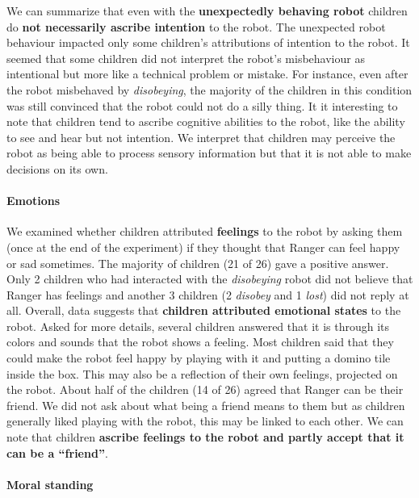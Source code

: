 \documentclass{sig-alternate}
\begin{document}
We can summarize that even with the \textbf{unexpectedly behaving robot}
children do \textbf{not necessarily ascribe intention} to the robot. The
unexpected robot behaviour impacted only some children's attributions of
intention to the robot.  It seemed that some children did not interpret the
robot's misbehaviour as intentional but more like a technical problem or
mistake. For instance, even after the robot misbehaved by \textit{disobeying},
the majority of the children in this condition was still convinced that the
robot could not do a silly thing.  It it interesting to note that children tend
to ascribe cognitive abilities to the robot, like the ability to see and hear
but not intention. We interpret that children may perceive the robot as being
able to process sensory information but that it is not able to make decisions on
its own. 

\paragraph{Emotions}

We examined whether children attributed \textbf{feelings} to the robot by asking
them (once at the end of the experiment) if they thought that Ranger can feel
happy or sad sometimes. The majority of
children (21 of 26) gave a positive answer. Only 2 children who had interacted
with the \textit{disobeying} robot did not believe that Ranger has feelings and
another 3 children (2 \textit{disobey} and 1 \textit{lost}) did not reply at
all. Overall, data suggests that \textbf{children attributed emotional states}
to the robot. Asked for more details, several children answered that it is
through its colors and sounds that the robot shows a feeling. Most children said
that they could make the robot feel happy by playing with it and putting a
domino tile inside the box. This may also be a reflection of their own feelings,
projected on the robot. About half of the children (14 of 26) agreed that Ranger
can be their friend. We did not ask about what being a friend means to them but
as children generally liked playing with the robot, this may be linked to each
other. We can note that children \textbf{ascribe feelings to the robot and
partly accept that it can be a ``friend''}.


\paragraph{Moral standing}
\end{document}
